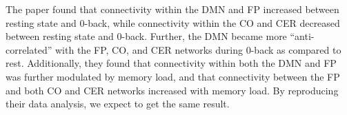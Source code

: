 \documentclass[11pt]{article}
\begin{document}
The paper found that connectivity within the DMN and FP increased between
resting state and 0-back, while connectivity within the CO and CER decreased
between resting state and 0-back. Further, the DMN became more “anti-correlated”
with the FP, CO, and CER networks during 0-back as compared to rest.
Additionally, they found that connectivity within both the DMN and FP was
further modulated by memory load, and that connectivity between the FP and both
CO and CER networks increased with memory load. By reproducing their data
analysis, we expect to get the same result.


\end{document}
